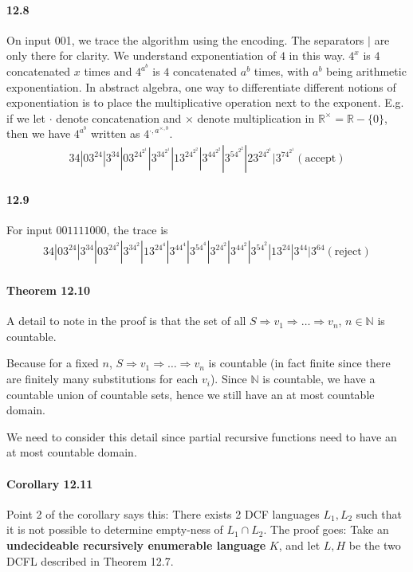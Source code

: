 \documentclass{article}
\begin{document}
\paragraph{12.8}
On input 001, we trace the algorithm using the encoding. The separators $|$ are only there for clarity. We understand exponentiation of $4$ in this way. $4^x$ is $4$ concatenated $x$ times and $4^{a^b}$ is $4$ concatenated $a^b$ times, with $a^b$ being arithmetic exponentiation. In abstract algebra, one way to differentiate different notions of exponentiation is to place the multiplicative operation next to the exponent. E.g. if we let $\cdot$ denote concatenation and $\times$ denote multiplication in $\mathbb{R}^\times=\mathbb{R}-\{0\}$, then we have $4^{a^b}$ written as $4^{\cdot, a^{\times, b}}$.
\begin{align*}
	34 | 03^24 | 3^34 | 03^24^{2^1} | 3^34^{2^1} | 13^24^{2^2} | 3^44^{2^2} | 3^54^{2^2} | 23^24^{2^1} | 3^74^{2^1} (\text{accept})
\end{align*}

\paragraph{12.9}
For input $001111000$, the trace is
\begin{align*}
	34 | 03^24 | 3^34 | 03^24^2 | 3^34^2 | 13^24^4 | 3^44^4 | 3^54^4 | 3^24^2 | 3^44^2 | 3^54^2 | 13^24 | 3^44 | 3^64 (\text{reject})
\end{align*}

\paragraph{Theorem 12.10}
A detail to note in the proof is that the set of all $S\Rightarrow v_1\Rightarrow \dots \Rightarrow v_n$, $n\in \mathbb{N}$ is countable.

Because for a fixed $n$, $S\Rightarrow v_1\Rightarrow \dots \Rightarrow v_n$ is countable (in fact finite since there are finitely many substitutions for each $v_i$). Since $\mathbb{N}$ is countable, we have a countable union of countable sets, hence we still have an at most countable domain.

We need to consider this detail since partial recursive functions need to have an at most countable domain.

\paragraph{Corollary 12.11}
Point 2 of the corollary says this: There exists 2 DCF languages $L_1,L_2$ such that it is not possible to determine empty-ness of $L_1\cap L_2$. The proof goes: Take an \textbf{undecideable recursively enumerable language} $K$, and let $L, H$ be the two DCFL described in Theorem 12.7.
\end{document}
